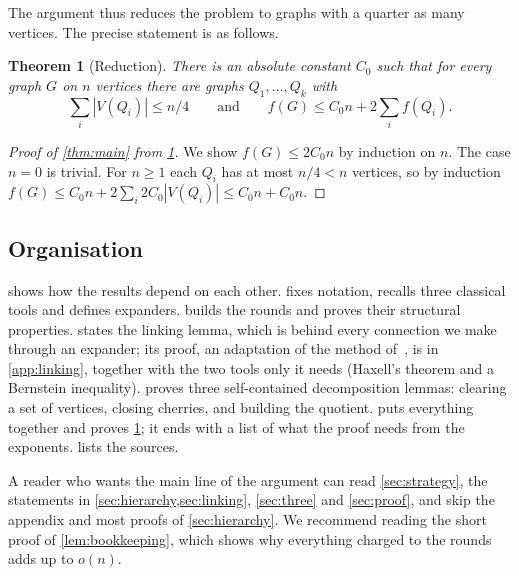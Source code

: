 \documentclass[11pt]{article}
\newtheorem{theorem}{Theorem}[section]
\theoremstyle{definition}
\theoremstyle{remark}
\numberwithin{equation}{section}
\numberwithin{figure}{section}
\numberwithin{table}{section}
\begin{document}
The argument thus reduces the problem to graphs with a quarter as many
vertices. The precise statement is as follows.

\begin{theorem}[Reduction]\label{thm:reduction}
There is an absolute constant $C_0$ such that for every graph $G$ on $n$
vertices there are graphs $Q_1,\dots,Q_k$ with
\[
\textstyle\sum_{i}|V(Q_i)|\le n/4
\qquad\text{and}\qquad
f(G)\le C_0n+2\sum_{i}f(Q_i).
\]
\end{theorem}

\begin{proof}[Proof of \cref{thm:main} from \cref{thm:reduction}]
We show $f(G)\le 2C_0n$ by induction on $n$. The case $n=0$ is trivial. For
$n\ge1$ each $Q_i$ has at most $n/4<n$ vertices, so by induction
$f(G)\le C_0n+2\sum_i2C_0|V(Q_i)|\le C_0n+C_0n$.
\end{proof}

\subsection{Organisation}\label{sec:organisation}

 shows how the results depend on each other. 
fixes notation, recalls three classical tools and defines expanders.
 builds the rounds and proves their structural properties.
 states the linking lemma, which is behind every connection we
make through an expander; its proof, an adaptation of the method of~\cite{BM},
is in \cref{app:linking}, together with the two tools only it needs (Haxell's
theorem and a Bernstein inequality).  proves three
self-contained decomposition lemmas: clearing a set of vertices, closing
cherries, and building the quotient.  puts everything together
and proves \cref{thm:reduction}; it ends with a list of what the proof needs
from the exponents.  lists the sources.

A reader who wants the main line of the argument can read \cref{sec:strategy},
the statements in \cref{sec:hierarchy,sec:linking}, \cref{sec:three} and
\cref{sec:proof}, and skip the appendix and most proofs of \cref{sec:hierarchy}.
We recommend reading the short proof of \cref{lem:bookkeeping}, which shows why
everything charged to the rounds adds up to $o(n)$.
\end{document}
